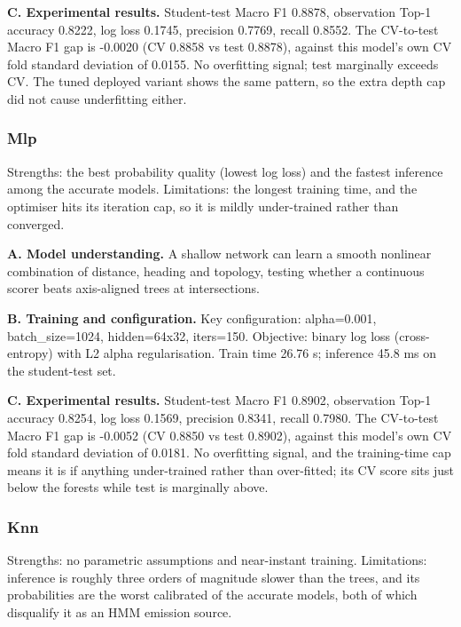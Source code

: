 \documentclass[11pt,a4paper]{article}
\begin{document}
\noindent\textbf{C. Experimental results.} Student-test Macro F1 0.8878, observation Top-1 accuracy 0.8222, log loss 0.1745, precision 0.7769, recall 0.8552. The CV-to-test Macro F1 gap is -0.0020 (CV 0.8858 vs test 0.8878), against this model's own CV fold standard deviation of 0.0155. No overfitting signal; test marginally exceeds CV. The tuned deployed variant shows the same pattern, so the extra depth cap did not cause underfitting either.

\subsubsection{Mlp}

Strengths: the best probability quality (lowest log loss) and the fastest inference among the accurate models. Limitations: the longest training time, and the optimiser hits its iteration cap, so it is mildly under-trained rather than converged.

\noindent\textbf{A. Model understanding.} A shallow network can learn a smooth nonlinear combination of distance, heading and topology, testing whether a continuous scorer beats axis-aligned trees at intersections.

\noindent\textbf{B. Training and configuration.} Key configuration: alpha=0.001, batch\_size=1024, hidden=64x32, iters=150. Objective: binary log loss (cross-entropy) with L2 alpha regularisation. Train time 26.76 s; inference 45.8 ms on the student-test set.

\noindent\textbf{C. Experimental results.} Student-test Macro F1 0.8902, observation Top-1 accuracy 0.8254, log loss 0.1569, precision 0.8341, recall 0.7980. The CV-to-test Macro F1 gap is -0.0052 (CV 0.8850 vs test 0.8902), against this model's own CV fold standard deviation of 0.0181. No overfitting signal, and the training-time cap means it is if anything under-trained rather than over-fitted; its CV score sits just below the forests while test is marginally above.

\subsubsection{Knn}

Strengths: no parametric assumptions and near-instant training. Limitations: inference is roughly three orders of magnitude slower than the trees, and its probabilities are the worst calibrated of the accurate models, both of which disqualify it as an HMM emission source.
\end{document}
